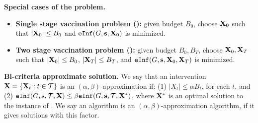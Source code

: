 \noindent
\textbf{Special cases of the \prob{} problem.}
\begin{itemize}
\item
\textbf{Single stage vaccination problem (\probone):} given budget $B_0$, choose $\mathbf{X}_0$ such that $|\mathbf{X}_0|\leq B_0$
and $\texttt{eInf}(G, \mathbf{s}, \mathbf{X}_0)$ is minimized.
\item
\textbf{Two stage vaccination problem (\probtwo):} given budget $B_0, B_T$, choose $\mathbf{X}_0, \mathbf{X}_T$ such that
$|\mathbf{X}_0|\leq B_0$, $|\mathbf{X}_T|\leq B_T$, and $\texttt{eInf}(G, \mathbf{s}, \mathbf{X}_0, \mathbf{X}_T)$ is minimized.
\end{itemize}

\noindent
\textbf{Bi-criteria approximate solution.}
We say that an intervention $\mathbf{X}=\{\mathbf{X}_t: t\in\mathcal{T}\}$ is an $(\alpha, \beta)$-approximation if:
(1) $|X_t|\leq \alpha B_t$, for each $t$, and
(2) $\texttt{eInf}(G, \mathbf{s}, \mathcal{T}, \mathbf{X})\leq \beta \texttt{eInf}(G, \mathbf{s}, \mathcal{T}, \mathbf{X}^*)$, where
$\mathbf{X}^*$ is an optimal solution to the instance of \prob{}.
We say an algorithm is an $(\alpha, \beta)$-approximation algorithm, if it gives solutions with this factor.

